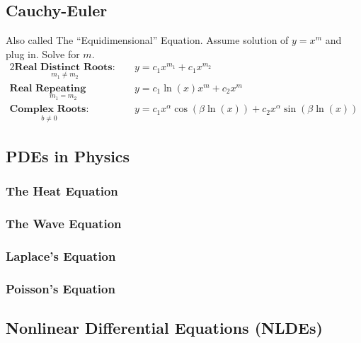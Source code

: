 \subsection*{Cauchy-Euler}
    Also called The ``Equidimensional'' Equation. Assume solution of $y=x^m$ and plug in. Solve for $m$.
    \begin{alignat}{2}
        \underset { m_1 \neq m_2}{\textbf{Real Distinct Roots:}}
        &\quad y=c_1x^{m_1}+c_1x^{m_2}\\[0.7 cm]
        \underset{m_1=m_2}{\textbf{Real Repeating Roots:}}
        &\quad y=c_1\ln(x)x^m+c_2x^m\\[0.7 cm]
        \underset{b \neq 0}{\textbf{Complex Roots:}}
        &\quad y=c_{1}x^{\alpha }\cos(\beta \ln(x))+c_{2}x^{\alpha }\sin(\beta \ln(x))
    \end{alignat}
    \subsection{PDEs in Physics} 
    \subsubsection{The Heat Equation} %
    \subsubsection{The Wave Equation} %
    \subsubsection{Laplace's Equation} %
    \subsubsection{Poisson's Equation} %
\subsection{Nonlinear Differential Equations (NLDEs)}
%